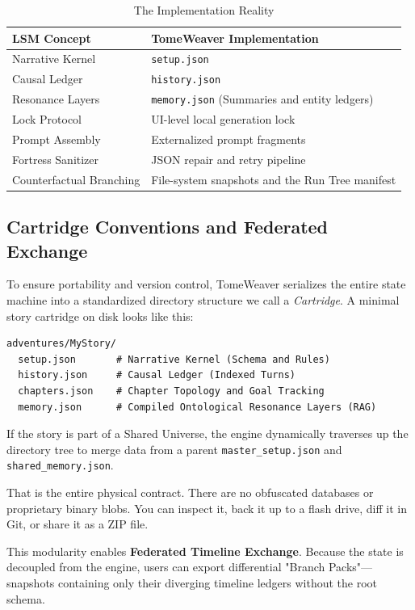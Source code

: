 \documentclass[12pt, a4paper]{article}
\begin{document}
\begin{table}[hbt!]
\centering
\caption{The Implementation Reality}
\label{tab:implementation}
\renewcommand{\arraystretch}{1.4}
\begin{tabular}{p{} p{}}
\toprule
\textbf{LSM Concept} & \textbf{TomeWeaver Implementation} \\
\midrule
Narrative Kernel & \texttt{setup.json} \\
Causal Ledger & \texttt{history.json} \\
Resonance Layers & \texttt{memory.json} (Summaries and entity ledgers) \\
Lock Protocol & UI-level local generation lock \\
Prompt Assembly & Externalized prompt fragments \\
Fortress Sanitizer & JSON repair and retry pipeline \\
Counterfactual Branching & File-system snapshots and the Run Tree manifest \\
\bottomrule
\end{tabular}
\end{table}

\subsection{Cartridge Conventions and Federated Exchange}

To ensure portability and version control, TomeWeaver serializes the entire state machine into a standardized directory structure we call a \textit{Cartridge}. A minimal story cartridge on disk looks like this:

\begin{verbatim}
adventures/MyStory/
  setup.json       # Narrative Kernel (Schema and Rules)
  history.json     # Causal Ledger (Indexed Turns)
  chapters.json    # Chapter Topology and Goal Tracking
  memory.json      # Compiled Ontological Resonance Layers (RAG)
\end{verbatim}

If the story is part of a Shared Universe, the engine dynamically traverses up the directory tree to merge data from a parent \texttt{master\_setup.json} and \texttt{shared\_memory.json}. 

That is the entire physical contract. There are no obfuscated databases or proprietary binary blobs. You can inspect it, back it up to a flash drive, diff it in Git, or share it as a ZIP file.

This modularity enables \textbf{Federated Timeline Exchange}. Because the state is decoupled from the engine, users can export differential "Branch Packs"---snapshots containing only their diverging timeline ledgers without the root schema. 
\end{document}
